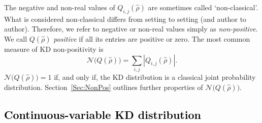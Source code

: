 \documentclass[%
 reprint,
superscriptaddress,
nofootinbib,
bibnotes,
 amsmath,amssymb,
 aps,
]{revtex4-1}
\theoremstyle{plain}
\newcommand{\Dave}[1]{\textcolor{black}{#1} }
\newcommand{\LParen}{ \bm{(} }
\newcommand{\RParen}{ \bm{)} }
\begin{document}
The negative and non-real values of $Q_{i,j}(\hat\rho)$ are sometimes called `non-classical'.  What is considered non-classical differs from setting to setting (and author to author). Therefore, we refer to negative or non-real values simply as  \emph{non-positive}. 
We call $Q \left( \hat{\rho} \right) $ \emph{positive} if all its entries are positive or zero.  The most common measure of KD non-positivity is~\cite{Alonso_OTOC_2019}
\begin{equation}
\label{Eq:TotKDNonPos1}
\mathcal{N} \LParen Q (\hat{\rho})  \RParen = \sum_{i,j}  \left| Q_{i,j} (\hat{\rho}) \right|  .
\end{equation}
$\mathcal{N} \LParen Q (\hat{\rho})  \RParen=1$ if, and only if, the KD distribution is a classical joint probability distribution. Section~\ref{Sec:NonPos} outlines further properties of $\mathcal{N} \LParen Q (\hat{\rho})  \RParen$.



\subsection{\Dave{Continuous-variable KD distribution}}
\label{SubSec:ContinuousKD}
\end{document}
